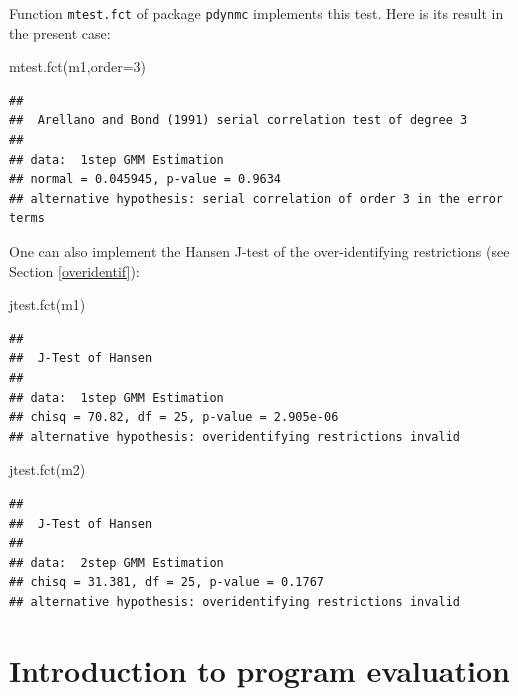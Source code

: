 \documentclass[
  12pt,
]{book}
\newenvironment{Shaded}{\begin{snugshade}}{\end{snugshade}}
\newcommand{\AttributeTok}[1]{\textcolor[rgb]{0.77,0.63,0.00}{#1}}
\newcommand{\DecValTok}[1]{\textcolor[rgb]{0.00,0.00,0.81}{#1}}
\newcommand{\FunctionTok}[1]{\textcolor[rgb]{0.00,0.00,0.00}{#1}}
\newcommand{\NormalTok}[1]{#1}
\theoremstyle{definition}
\theoremstyle{definition}
\theoremstyle{definition}
\theoremstyle{definition}
\theoremstyle{remark}
\begin{document}
Function \texttt{mtest.fct} of package \texttt{pdynmc} implements this test. Here is its result in the present case:

\begin{Shaded}
\begin{Highlighting}[]
\FunctionTok{mtest.fct}\NormalTok{(m1,}\AttributeTok{order=}\DecValTok{3}\NormalTok{)}
\end{Highlighting}
\end{Shaded}

\begin{verbatim}
## 
##  Arellano and Bond (1991) serial correlation test of degree 3
## 
## data:  1step GMM Estimation
## normal = 0.045945, p-value = 0.9634
## alternative hypothesis: serial correlation of order 3 in the error terms
\end{verbatim}

One can also implement the Hansen J-test of the over-identifying restrictions (see Section \ref{overidentif}):

\begin{Shaded}
\begin{Highlighting}[]
\FunctionTok{jtest.fct}\NormalTok{(m1)}
\end{Highlighting}
\end{Shaded}

\begin{verbatim}
## 
##  J-Test of Hansen
## 
## data:  1step GMM Estimation
## chisq = 70.82, df = 25, p-value = 2.905e-06
## alternative hypothesis: overidentifying restrictions invalid
\end{verbatim}

\begin{Shaded}
\begin{Highlighting}[]
\FunctionTok{jtest.fct}\NormalTok{(m2)}
\end{Highlighting}
\end{Shaded}

\begin{verbatim}
## 
##  J-Test of Hansen
## 
## data:  2step GMM Estimation
## chisq = 31.381, df = 25, p-value = 0.1767
## alternative hypothesis: overidentifying restrictions invalid
\end{verbatim}

\hypertarget{introduction-to-program-evaluation}{%
\section{Introduction to program evaluation}\label{introduction-to-program-evaluation}}
\end{document}
